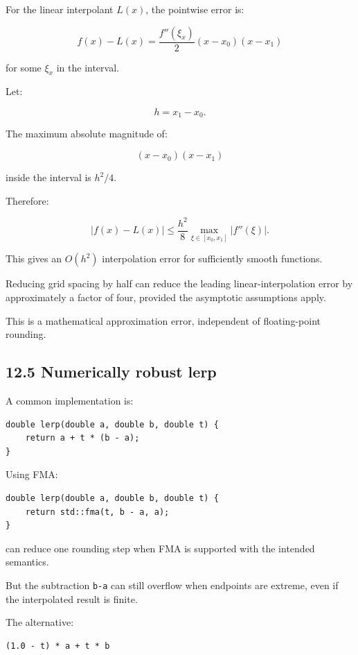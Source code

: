 For the linear interpolant \(L(x)\), the pointwise error is:

\[ \boxed{ f(x)-L(x) = \frac{f''(\xi_x)}2 (x-x_0)(x-x_1) } \]

for some \(\xi_x\) in the interval.

Let:

\[ h=x_1-x_0. \]

The maximum absolute magnitude of:

\[ (x-x_0)(x-x_1) \]

inside the interval is \(h^2/4\).

Therefore:

\[ \boxed{ |f(x)-L(x)| \le \frac{h^2}{8} \max_{\xi\in[x_0,x_1]}|f''(\xi)| }. \]

This gives an \(O(h^2)\) interpolation error for sufficiently smooth functions.

Reducing grid spacing by half can reduce the leading linear-interpolation error by approximately a factor of four, provided the asymptotic assumptions apply.

This is a mathematical approximation error, independent of floating-point rounding.

\subsection{12.5 Numerically robust lerp}\label{02-foundations-ii-ch028-numerically-robust-lerp}

A common implementation is:

\begin{verbatim}
double lerp(double a, double b, double t) {
    return a + t * (b - a);
}
\end{verbatim}

Using FMA:

\begin{verbatim}
double lerp(double a, double b, double t) {
    return std::fma(t, b - a, a);
}
\end{verbatim}

can reduce one rounding step when FMA is supported with the intended semantics.

But the subtraction \texttt{b-a} can still overflow when endpoints are extreme, even if the interpolated result is finite.

The alternative:

\begin{verbatim}
(1.0 - t) * a + t * b
\end{verbatim}

